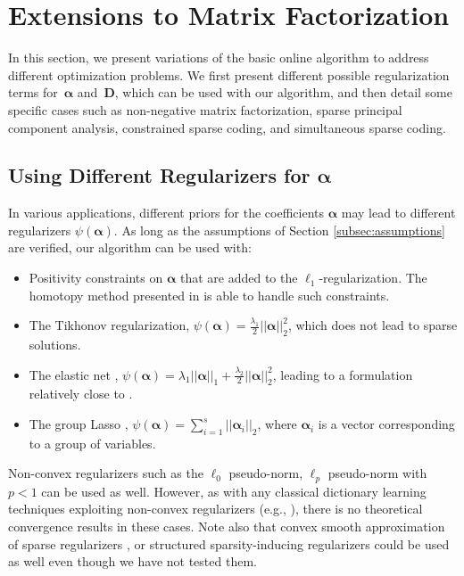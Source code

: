 \documentclass[twoside,11pt]{article}
\def\alphab{{\boldsymbol\alpha}}
\def\D{{\mathbf D}}
\begin{document}
\section{Extensions to Matrix Factorization} \label{sec:variations}
In this section, we present variations of the basic online algorithm to
address different optimization problems. We first present different
possible regularization terms for~$\alphab$ and~$\D$, which can be used
with our algorithm, and then detail some specific cases such as
non-negative matrix factorization, sparse principal component
analysis, constrained sparse coding,
and simultaneous sparse coding.
\subsection{Using Different Regularizers for $\alphab$}
In various applications, different priors for
the coefficients $\alphab$ may lead to different regularizers $\psi(\alphab)$.
As long as the assumptions of Section \ref{subsec:assumptions} are verified,
our algorithm can be used with:
\begin{itemize}
   \item Positivity constraints on $\alphab$ that are added to the $\ell_1$-regularization.
      The homotopy method presented in \citet{efron} is able to handle such constraints.
   \item The Tikhonov regularization, $\psi(\alphab) = \frac{\lambda_1}{2}||\alphab||_2^2$,
      which does not lead to sparse solutions.
   \item The elastic net \citep{zou}, $\psi(\alphab)= \lambda_1
      ||\alphab||_1 + \frac{\lambda_2}{2} ||\alphab||_2^2$, leading to a formulation relatively close to \citet{zou2}.
   \item The group Lasso \citep{yuan,turlach,bach}, $\psi(\alphab) = \sum_{i=1}^s
      ||\alphab_i||_2$, where $\alphab_i$ is a vector corresponding to a 
      group of variables.
\end{itemize}
Non-convex regularizers such as the $\ell_0$ pseudo-norm, $\ell_p$ pseudo-norm
with $p < 1$
can be used as well. However, as with any classical dictionary
learning techniques exploiting non-convex regularizers
(e.g., \citealp{field,engan,aharon}), there is no theoretical 
convergence results in these cases.
Note also that convex smooth approximation of sparse regularizers \citep{bradley},
or structured sparsity-inducing regularizers \citep{jenatton,jacob} 
could be used as well even though we have not tested them.
\end{document}
